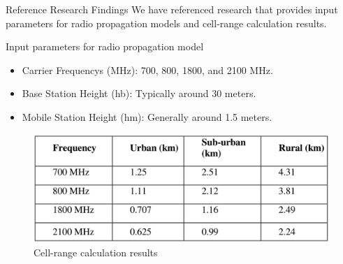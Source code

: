 \begin{frame}{Reference Research Findings}
    We have referenced research that provides input parameters for radio propagation models and cell-range calculation results.
    \begin{block}{Input parameters for radio propagation model}
        \begin{itemize}
            \item Carrier Frequencys (MHz): 700, 800, 1800, and 2100 MHz.
            \item Base Station Height (hb): Typically around 30 meters.
            \item Mobile Station Height (hm): Generally around 1.5 meters.
        \end{itemize}
    \end{block}
    \begin{figure}
        \includegraphics[height=0.35\paperheight]{images/Altair/cell_range_calc_res.png}
        \caption{Cell-range calculation results}
    \end{figure}
\end{frame}

